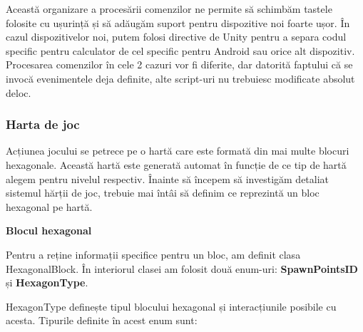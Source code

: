 \documentclass[12pt, a4paper]{article}
\begin{document}
	Această organizare a procesării comenzilor ne permite să schimbăm tastele folosite cu ușurință și să adăugăm suport pentru dispozitive noi foarte ușor. În cazul dispozitivelor noi, putem folosi directive de Unity pentru a separa codul specific pentru calculator de cel specific pentru Android sau orice alt dispozitiv. Procesarea comenzilor în cele 2 cazuri vor fi diferite, dar datorită faptului că se invocă evenimentele deja definite, alte script-uri nu trebuiesc modificate absolut deloc.
	
	
	
	
	
	\subsubsection{Harta de joc}
	
	Acțiunea jocului se petrece pe o hartă care este formată din mai multe blocuri hexagonale. Această hartă este generată automat în funcție de ce tip de hartă alegem pentru nivelul respectiv. Înainte să începem să investigăm detaliat sistemul hărții de joc, trebuie mai întâi să definim ce reprezintă un bloc hexagonal pe hartă.
	\newline
	
	
	
	
	
	\textbf{Blocul hexagonal}
	
	Pentru a reține informații specifice pentru un bloc, am definit clasa HexagonalBlock. În interiorul clasei am folosit două enum-uri: \textbf{SpawnPointsID} și \textbf{HexagonType}.
	\newline
	
	HexagonType definește tipul blocului hexagonal și interacțiunile posibile cu acesta. Tipurile definite în acest enum sunt:
	
\end{document}
